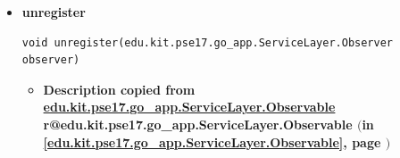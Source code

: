 \documentclass[11pt,a4paper]{report}
\makeatletter
\newcommand{\refdefined}[1]{
\expandafter\ifx\csname r@#1\endcsname\relax
\relax\else
{$($in \ref{#1}, page \pageref{#1}$)$}\fi}
\makeatother
\begin{document}
{{{{{{{{{{{{{{{\begin{itemize}
{\begin{itemize}
{Mit dieser Methode kann man einen neuen Observer registrieren. Er wird zu einer Liste von observern hinzugefügt, falls diese Liste noch nicht vorhanden ist, wird sie erstellt. Der Beobachter ist nach dem Hinzufügen zu der Liste funktionsfähig.
}
\item{
{\bf  Parameters}
  \begin{itemize}
   \item{
\texttt{observer} -- der Observer, der registriert werden soll. Dabei spielt es keine Rolle, um welche Implementierung eines Observers es sich handelt.}
  \end{itemize}
}%
\end{itemize}
}%
\item{ 
\hypertarget{edu.kit.pse17.go_app.PersistenceLayer.daos.UserDaoImp.unregister(edu.kit.pse17.go_app.ServiceLayer.Observer)}{{\bf  unregister}\\}
\begin{lstlisting}[frame=none]
void unregister(edu.kit.pse17.go_app.ServiceLayer.Observer observer)\end{lstlisting} %
\begin{itemize}
\item{
{\bf  Description copied from \hyperlink{edu.kit.pse17.go_app.ServiceLayer.Observable}{edu.kit.pse17.go_app.ServiceLayer.Observable}{\small \refdefined{edu.kit.pse17.go_app.ServiceLayer.Observable}} }

}
\end{itemize}}
\end{itemize}}}}}}}}}}}}}}}}
\end{document}
